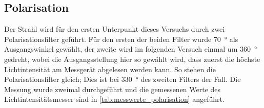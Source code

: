 \documentclass[ngerman]{scrartcl}
\begin{document}
\subsection{Polarisation}
\label{sec:durchfuehrung_polarisation}
Der Strahl wird für den ersten Unterpunkt dieses Versuchs durch zwei Polarisationsfilter geführt. Für den ersten der beiden Filter wurde \SI{70}{\degree} als Ausgangswinkel gewählt, der zweite wird im folgenden Versuch einmal um \SI{360}{\degree} gedreht, wobei die Ausgangsstellung hier so gewählt wird, dass zuerst die höchste Lichtintensität am Messgerät abgelesen werden kann. So stehen die Polarisationsfilter gleich; Dies ist bei \SI{330}{\degree} des zweiten Filters der Fall. 
Die Messung wurde zweimal durchgeführt und die gemessenen Werte des Lichtintensitätsmesser sind in \autoref{tab:messwerte_polarisation} angeführt.
\end{document}
